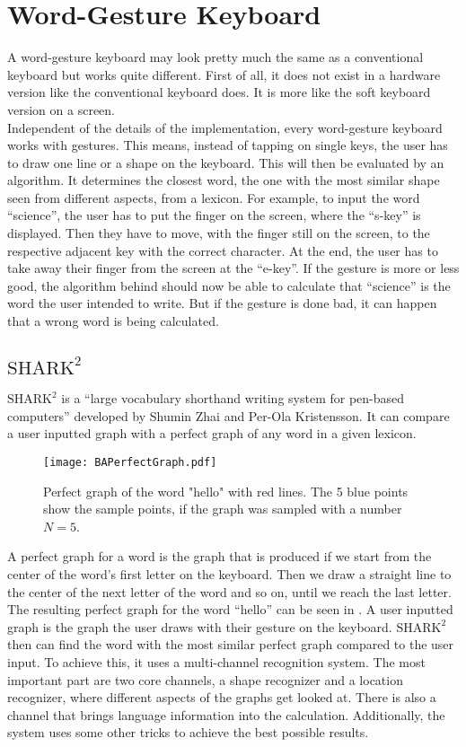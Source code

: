 \section{Word-Gesture Keyboard}
A word-gesture keyboard may look pretty much the same as a conventional keyboard but works quite different. First of all, it does not exist in a hardware version like the conventional keyboard does. It is more like the soft keyboard version on a screen.\\
Independent of the details of the implementation, every word-gesture keyboard works with gestures. This means, instead of tapping on single keys, the user has to draw one line or a shape on the keyboard. This will then be evaluated by an algorithm. It determines the closest word, the one with the most similar shape seen from different aspects, from a lexicon. For example, to input the word ``science'', the user has to put the finger on the screen, where the ``s-key'' is displayed. Then they have to move, with the finger still on the screen, to the respective adjacent key with the correct character. At the end, the user has to take away their finger from the screen at the ``e-key''. If the gesture is more or less good, the algorithm behind should now be able to calculate that ``science'' is the word the user intended to write. But if the gesture is done bad, it can happen that a wrong word is being calculated. 

\subsection{$\text{SHARK}^2$}
\label{SHARK2}
$\text{SHARK}^2$ is a ``large vocabulary shorthand writing system for pen-based computers'' \cite{Kristensson2004SHARK2AL} developed by Shumin Zhai and Per-Ola Kristensson. It can compare a user inputted graph with a perfect graph of any word in a given lexicon.
\begin{figure}[H]
    \centering
    \texttt{[image: BAPerfectGraph.pdf]}
    \caption{Perfect graph of the word "hello" with red lines. The 5 blue points show the sample points, if the graph was sampled with a number $N = 5$.}
    \label{fig:PerfectGraph}
\end{figure}
A perfect graph for a word is the graph that is produced if we start from the center of the word's first letter on the keyboard. Then we draw a straight line to the center of the next letter of the word and so on, until we reach the last letter. The resulting perfect graph for the word ``hello'' can be seen in . A user inputted graph is the graph the user draws with their gesture on the keyboard. $\text{SHARK}^2$ then can find the word with the most similar perfect graph compared to the user input. To achieve this, it uses a multi-channel recognition system. The most important part are two core channels, a shape recognizer and a location recognizer, where different aspects of the graphs get looked at. There is also a channel that brings language information into the calculation. Additionally, the system uses some other tricks to achieve the best possible results.\\
